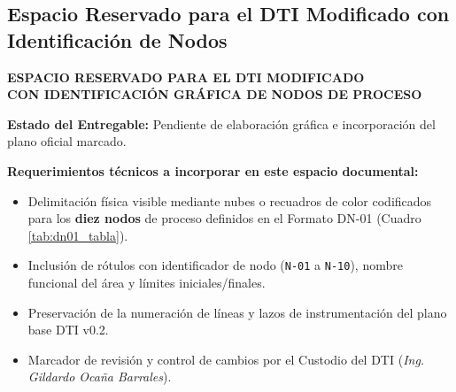 \documentclass[10pt,letterpaper]{article}
\begin{document}
\subsection{Espacio Reservado para el DTI Modificado con Identificación de Nodos}
\begin{landscape}
\thispagestyle{fancy}
\begin{tcolorbox}[colframe=navyblue,colback=boxbg,arc=4mm,boxrule=1.5pt,height=0.90\textheight,valign=center]
    \centering
    {\huge \textbf{\color{navyblue} ESPACIO RESERVADO PARA EL DTI MODIFICADO}}\\[0.3cm]
    {\LARGE \textbf{\color{accentblue} CON IDENTIFICACIÓN GRÁFICA DE NODOS DE PROCESO}}\\[0.6cm]
    \begin{tcolorbox}[colframe=darkred,colback=white,arc=2mm,boxrule=1pt,width=0.75\linewidth]
        \centering\large
        \textbf{\color{darkred} Estado del Entregable:} Pendiente de elaboración gráfica e incorporación del plano oficial marcado.
    \end{tcolorbox}
    \vspace{0.8cm}
    \begin{minipage}{0.85\linewidth}
        \small
        \textbf{Requerimientos técnicos a incorporar en este espacio documental:}
        \begin{itemize}
            \item Delimitación física visible mediante nubes o recuadros de color codificados para los \textbf{diez nodos} de proceso definidos en el Formato DN-01 (Cuadro \ref{tab:dn01_tabla}).
            \item Inclusión de rótulos con identificador de nodo (\texttt{N-01} a \texttt{N-10}), nombre funcional del área y límites iniciales/finales.
            \item Preservación de la numeración de líneas y lazos de instrumentación del plano base DTI v0.2.
            \item Marcador de revisión y control de cambios por el Custodio del DTI (\textit{Ing. Gildardo Ocaña Barrales}).
        \end{itemize}
    \end{minipage}
\end{tcolorbox}
\end{landscape}
\newpage
\end{document}
